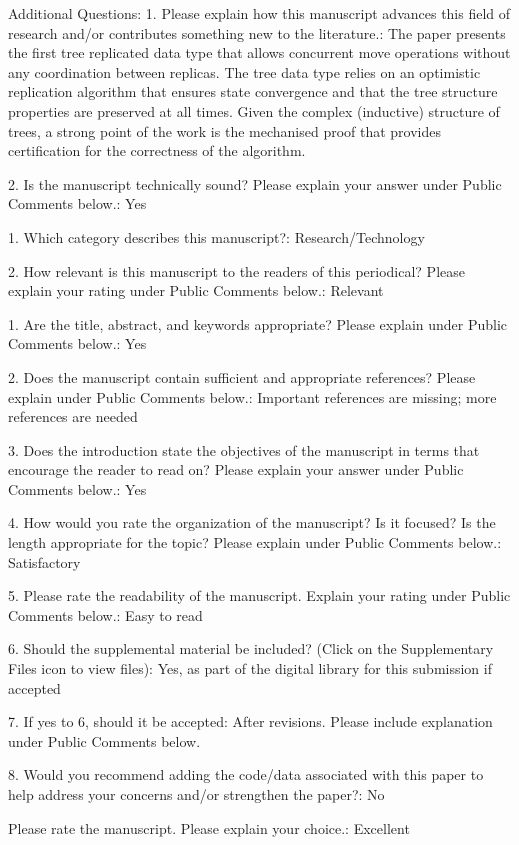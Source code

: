 \documentclass[10pt]{article}
\begin{document}
\begin{spverbatim}
Additional Questions:
1.  Please explain how this manuscript advances this field of research and/or contributes something new to the literature.: The paper presents the first tree replicated data type that allows concurrent move operations without any coordination between replicas. The tree data type relies on an optimistic replication algorithm that ensures state convergence and that the tree structure properties are preserved at all times. Given the complex (inductive) structure of trees, a strong point of the work is the mechanised proof that provides certification for the correctness of the algorithm.

2. Is the manuscript technically sound? Please explain your answer under Public Comments below.: Yes

1. Which category describes this manuscript?: Research/Technology

2. How relevant is this manuscript to the readers of this periodical? Please explain your rating under Public Comments below.: Relevant

1. Are the title, abstract, and keywords appropriate? Please explain under Public Comments below.: Yes

2. Does the manuscript contain sufficient and appropriate references? Please explain under Public Comments below.: Important references are missing; more references are needed

3. Does the introduction state the objectives of the manuscript in terms that encourage the reader to read on? Please explain your answer under Public Comments below.: Yes

4. How would you rate the organization of the manuscript? Is it focused? Is the length appropriate for the topic? Please explain under Public Comments below.: Satisfactory

5. Please rate the readability of the manuscript. Explain your rating under Public Comments below.: Easy to read

6. Should the supplemental material be included? (Click on the Supplementary Files icon to view files): Yes, as part of the digital library for this submission if accepted

7. If yes to 6, should it be accepted: After revisions.  Please include explanation under Public Comments below.

8. Would you recommend adding the code/data associated with this paper to help address your concerns and/or strengthen the paper?: No

Please rate the manuscript. Please explain your choice.: Excellent
\end{spverbatim}
\end{document}
